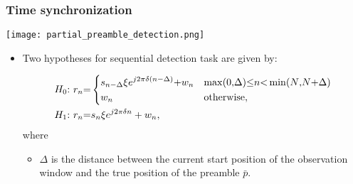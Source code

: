 \begin{frame}
    \frametitle{Time synchronization}

    \begin{center}
      \texttt{[image: partial\_preamble\_detection.png]}
    \end{center}

    \begin{itemize}
      \item Two hypotheses for sequential detection task are given by:
      
      \begin{equation}
        \label{eq:two hypotheses}
        \begin{aligned}
        &H_0{:}~r_n{=}
        \begin{dcases}
            s_{n-\Delta}\xi e^{j2\pi\delta (n-\Delta)}{+}w_n & \max(0{,}\Delta){\leq} n {<} \min(N{,}N{+}\Delta) \\
            w_n & \text{otherwise},
        \end{dcases} \\
        &H_1{:}~r_n{=}s_n\xi e^{j2\pi\delta n}+w_n,
        \end{aligned}
      \end{equation}
      where
      
      \begin{itemize}
          \item $\Delta$ is the distance between the current start position of the observation window and the true position of the preamble $\bar{p}$.
      \end{itemize}

    \end{itemize} 

\end{frame}


